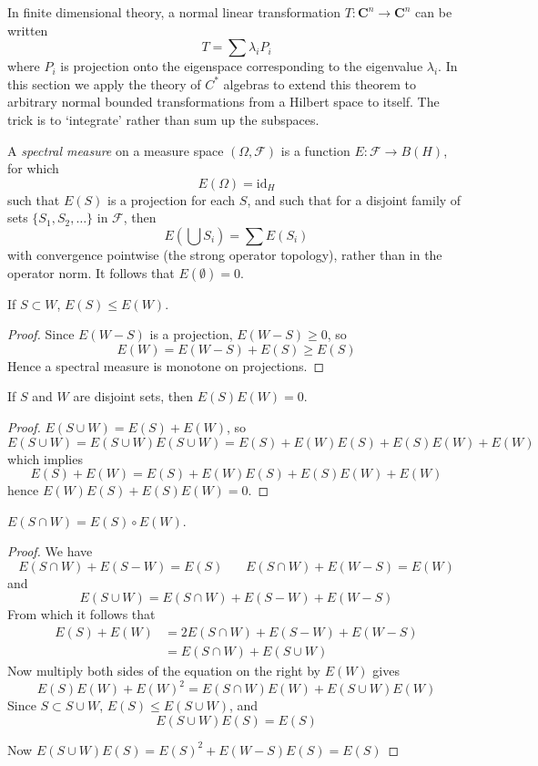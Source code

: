 In finite dimensional theory, a normal linear transformation $T: \mathbf{C}^n \to \mathbf{C}^n$ can be written
%
\[ T = \sum \lambda_i P_i \]
%
where $P_i$ is projection onto the eigenspace corresponding to the eigenvalue $\lambda_i$. In this section we apply the theory of $C^*$ algebras to extend this theorem to arbitrary normal bounded transformations from a Hilbert space to itself. The trick is to `integrate' rather than sum up the subspaces.

A \emph{spectral measure} on a measure space $(\Omega, \mathcal{F})$ is a function $E: \mathcal{F} \to B(H)$, for which
%
\[ E(\Omega) = \text{id}_H \]
%
such that $E(S)$ is a projection for each $S$, and such that for a disjoint family of sets $\{ S_1, S_2, \dots \}$ in $\mathcal{F}$, then
%
\[ E \left( \bigcup S_i \right) = \sum E(S_i) \]
%
with convergence pointwise (the strong operator topology), rather than in the operator norm. It follows that $E(\emptyset) = 0$.

\begin{lemma}
    If $S \subset W$, $E(S) \leq E(W)$.
\end{lemma}
\begin{proof}
    Since $E(W - S)$ is a projection, $E(W - S) \geq 0$, so
    \[ E(W) = E(W - S) + E(S) \geq E(S) \]
    Hence a spectral measure is monotone on projections.
\end{proof}

\begin{lemma}
    If $S$ and $W$ are disjoint sets, then $E(S)E(W) = 0$.
\end{lemma}
\begin{proof}
    $E(S \cup W) = E(S) + E(W)$, so
    \[ E(S \cup W) = E(S \cup W) E(S \cup W) = E(S) + E(W) E(S) + E(S)E(W) + E(W) \]
    which implies
    \[ E(S) + E(W) = E(S) + E(W) E(S) + E(S) E(W) + E(W) \]
    hence $E(W) E(S) + E(S) E(W) = 0$.
\end{proof}

\begin{lemma}
    $E(S \cap W) = E(S) \circ E(W)$.
\end{lemma}
\begin{proof}
    We have
    \[ E(S \cap W) + E(S - W) = E(S)\ \ \ \ \ \ \ \ E(S \cap W) + E(W - S) = E(W) \]
    and
    \[ E(S \cup W) = E(S \cap W) + E(S - W) + E(W - S) \]
    From which it follows that
    \begin{align*}
        E(S) + E(W) &= 2E(S \cap W) + E(S - W) + E(W - S)\\
        &= E(S \cap W) + E(S \cup W)
    \end{align*}
    Now multiply both sides of the equation on the right by $E(W)$ gives
    \[ E(S) E(W) + E(W)^2 = E(S \cap W) E(W) + E(S \cup W) E(W) \]
    Since $S \subset S \cup W$, $E(S) \leq E(S \cup W)$, and
    \[ E(S \cup W) E(S) = E(S) \]

    Now $E(S \cup W) E(S) = E(S)^2 + E(W - S) E(S) = E(S)$
\end{proof}

